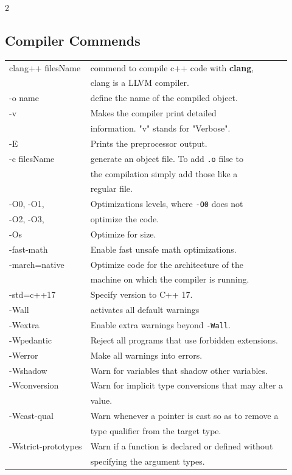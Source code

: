 \documentclass[5pt]{article}
\begin{document}
\begin{multicols}{2}
\subsection{Compiler Commends}
\begin{tabular}{>{\small\ttfamily}ll}
    clang++ filesName   & commend to compile c++ code with \textbf{clang},\\
                        & clang is a LLVM compiler.\\
    -o name             & define the name of the compiled object.\\ 
    -v                  & Makes the compiler print detailed\\
                        & information. "v" stands for "Verbose".\\
    -E                  & Prints the preprocessor output.\\
    -c filesName        & generate an object file. To add \texttt{.o} filse to\\
                        & the compilation simply add those like a\\
                        & regular file.\\  
    -O0, -O1,           & Optimizations levels, where \texttt{-O0} does not\\
    -O2, -O3,           & optimize the code.\\
    -Os                 & Optimize for size.\\
    -fast-math          & Enable fast unsafe math optimizations.\\
    -march=native       & Optimize code for the architecture of the\\
                        & machine on which the compiler is running.\\
    -std=c++17          & Specify version to C++ 17.\\
    -Wall               & activates all default warnings\\
    -Wextra             & Enable extra warnings beyond \texttt{-Wall}.\\
    -Wpedantic          & Reject all programs that use forbidden extensions.\\
    -Werror             & Make all warnings into errors.\\
    -Wshadow            & Warn for variables that shadow other variables.\\
    -Wconversion        & Warn for implicit type conversions that may alter a\\
                        & value.\\
    -Wcast-qual         & Warn whenever a pointer is cast so as to remove a\\
                        & type qualifier from the target type.\\
    -Wstrict-prototypes & Warn if a function is declared or defined without\\
                        & specifying the argument types.\\
\end{tabular}


\end{multicols}
\end{document}
